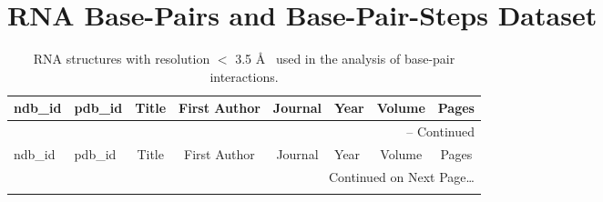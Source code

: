 \chapter{RNA Base-Pairs and Base-Pair-Steps Dataset}
\label{appendix3a}

\footnotesize{
\begin{landscape}
\begin{center}
\begin{longtable}{p{0.76cm}   p{0.74cm}  p{5.2cm}   p{5.2cm}  p{3.2cm}
    p{0.6cm} p{0.9cm} p{1.8cm}}
\caption{RNA structures  with resolution  $<$ 3.5 \AA~ used in the  analysis of
base-pair interactions.}\\

\hline
ndb\_id      &     pdb\_id      &      \multicolumn{1}{c}{Title}     &
\multicolumn{1}{c}{First Author}  & \multicolumn{1}{c}{Journal} & Year
& \multicolumn{1}{c}{Volume} & \multicolumn{1}{c}{Pages} \\ \hline \hline
\endfirsthead

\multicolumn{8}{r}{{\tablename} \thetable{} -- Continued} \\
\hline
ndb\_id      &     pdb\_id      &      \multicolumn{1}{c}{Title}     &
\multicolumn{1}{c}{First Author}  & \multicolumn{1}{c}{Journal} & Year
& \multicolumn{1}{c}{Volume} & \multicolumn{1}{c}{Pages} \\ \hline \hline
\endhead

\multicolumn{8}{r}{Continued on Next Page\ldots} \\
\endfoot
\endlastfoot


\end{longtable}
\end{center}
\end{landscape}}
